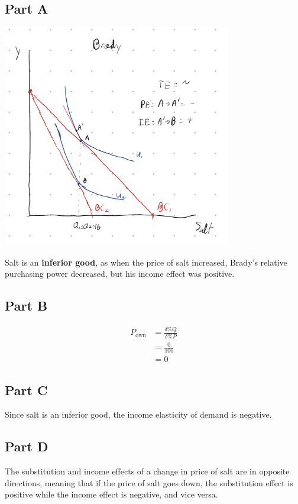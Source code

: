 \documentclass[8pt]{extarticle}
\newcommand{\plain}[1]{\textrm{#1}}
\begin{document}
{\subsection*{Part A}
\begin{center}
	\includegraphics[width=10cm]{HW4Q8A}
\end{center}
Salt is an \textbf{inferior good}, as when the price of salt increased, Brady's relative purchasing power decreased, but his income effect was positive.
\subsection*{Part B}
\begin{align*}
	P_{\plain{own}} &= \frac{\delta\% Q}{\delta \% P} \\
	&= \frac{0}{100} \\
	&= 0
\end{align*}
\subsection*{Part C}
 Since salt is an inferior good, the income elasticity of demand is negative.
\subsection*{Part D}
The substitution and income effects of a change in price of salt are in opposite directions, meaning that if the price of salt goes down, the substitution effect is positive while the income effect is negative, and vice versa.
}
\end{document}
